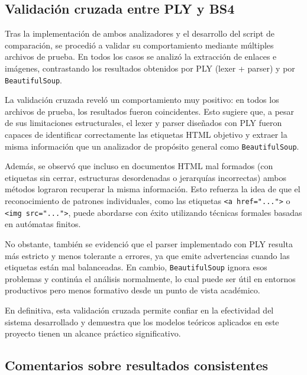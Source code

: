 \documentclass[11pt,a4paper]{article}
\begin{document}
\subsection{Validación cruzada entre PLY y BS4}

Tras la implementación de ambos analizadores y el desarrollo del script de comparación, se procedió a validar su comportamiento mediante múltiples archivos de prueba. En todos los casos se analizó la extracción de enlaces e imágenes, contrastando los resultados obtenidos por PLY (lexer + parser) y por \texttt{BeautifulSoup}.

\medskip

La validación cruzada reveló un comportamiento muy positivo: en todos los archivos de prueba, los resultados fueron coincidentes. Esto sugiere que, a pesar de sus limitaciones estructurales, el lexer y parser diseñados con PLY fueron capaces de identificar correctamente las etiquetas HTML objetivo y extraer la misma información que un analizador de propósito general como \texttt{BeautifulSoup}.

\medskip

Además, se observó que incluso en documentos HTML mal formados (con etiquetas sin cerrar, estructuras desordenadas o jerarquías incorrectas) ambos métodos lograron recuperar la misma información. Esto refuerza la idea de que el reconocimiento de patrones individuales, como las etiquetas \texttt{<a href="...">} o \texttt{<img src="...">}, puede abordarse con éxito utilizando técnicas formales basadas en autómatas finitos.

\medskip

No obstante, también se evidenció que el parser implementado con PLY resulta más estricto y menos tolerante a errores, ya que emite advertencias cuando las etiquetas están mal balanceadas. En cambio, \texttt{BeautifulSoup} ignora esos problemas y continúa el análisis normalmente, lo cual puede ser útil en entornos productivos pero menos formativo desde un punto de vista académico.

\medskip

En definitiva, esta validación cruzada permite confiar en la efectividad del sistema desarrollado y demuestra que los modelos teóricos aplicados en este proyecto tienen un alcance práctico significativo.

\subsection{Comentarios sobre resultados consistentes}
\end{document}
